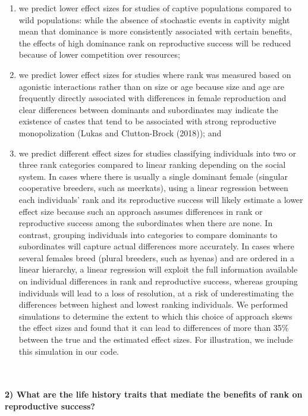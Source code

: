 \documentclass[
]{article}
\providecommand{\tightlist}{%
  \setlength{\itemsep}{0pt}\setlength{\parskip}{0pt}}
\begin{document}
\begin{enumerate}
\def\labelenumi{(\roman{enumi})}
\tightlist
\item
  we predict lower effect sizes for studies of captive populations
  compared to wild populations: while the absence of stochastic events
  in captivity might mean that dominance is more consistently associated
  with certain benefits, the effects of high dominance rank on
  reproductive success will be reduced because of lower competition over
  resources;
\item
  we predict lower effect sizes for studies where rank was measured
  based on agonistic interactions rather than on size or age because
  size and age are frequently directly associated with differences in
  female reproduction and clear differences between dominants and
  subordinates may indicate the existence of castes that tend to be
  associated with strong reproductive monopolization (Lukas and
  Clutton-Brock (2018)); and
\item
  we predict different effect sizes for studies classifying individuals
  into two or three rank categories compared to linear ranking depending
  on the social system. In cases where there is usually a single
  dominant female (singular cooperative breeders, such as meerkats),
  using a linear regression between each individuals' rank and its
  reproductive success will likely estimate a lower effect size because
  such an approach assumes differences in rank or reproductive success
  among the subordinates when there are none. In contrast, grouping
  individuals into categories to compare dominants to subordinates will
  capture actual differences more accurately. In cases where several
  females breed (plural breeders, such as hyenas) and are ordered in a
  linear hierarchy, a linear regression will exploit the full
  information available on individual differences in rank and
  reproductive success, whereas grouping individuals will lead to a loss
  of resolution, at a risk of underestimating the differences between
  highest and lowest ranking individuals. We performed simulations to
  determine the extent to which this choice of approach skews the effect
  sizes and found that it can lead to differences of more than 35\%
  between the true and the estimated effect sizes. For illustration, we
  include this simulation in our code.
\end{enumerate}

~

\hypertarget{what-are-the-life-history-traits-that-mediate-the-benefits-of-rank-on-reproductive-success-1}{%
\paragraph{\texorpdfstring{\textbf{2) What are the life history traits
that mediate the benefits of rank on reproductive
success?}}{2) What are the life history traits that mediate the benefits of rank on reproductive success?}}\label{what-are-the-life-history-traits-that-mediate-the-benefits-of-rank-on-reproductive-success-1}}
\end{document}
